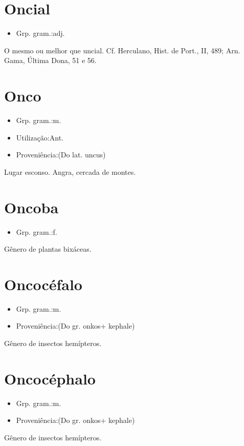 \section{Oncial}
\begin{itemize}
\item {Grp. gram.:adj.}
\end{itemize}
O mesmo ou melhor que \textunderscore uncial\textunderscore . Cf. Herculano, \textunderscore Hist. de Port.\textunderscore , II, 489; Arn. Gama, \textunderscore Última Dona\textunderscore , 51 e 56.
\section{Onco}
\begin{itemize}
\item {Grp. gram.:m.}
\end{itemize}
\begin{itemize}
\item {Utilização:Ant.}
\end{itemize}
\begin{itemize}
\item {Proveniência:(Do lat. \textunderscore uncus\textunderscore )}
\end{itemize}
Lugar esconso.
Angra, cercada de montes.
\section{Oncoba}
\begin{itemize}
\item {Grp. gram.:f.}
\end{itemize}
Gênero de plantas bixáceas.
\section{Oncocéfalo}
\begin{itemize}
\item {Grp. gram.:m.}
\end{itemize}
\begin{itemize}
\item {Proveniência:(Do gr. \textunderscore onkos\textunderscore  + \textunderscore kephale\textunderscore )}
\end{itemize}
Gênero de insectos hemípteros.
\section{Oncocéphalo}
\begin{itemize}
\item {Grp. gram.:m.}
\end{itemize}
\begin{itemize}
\item {Proveniência:(Do gr. \textunderscore onkos\textunderscore  + \textunderscore kephale\textunderscore )}
\end{itemize}
Gênero de insectos hemípteros.
